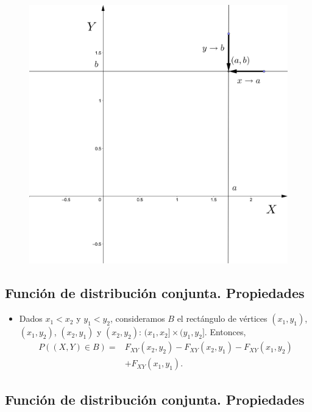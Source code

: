 \documentclass[]{book}
\providecommand{\tightlist}{%
  \setlength{\itemsep}{0pt}\setlength{\parskip}{0pt}}
\begin{document}
\begin{figure}
\includegraphics[width=450px]{Images/Fxy2} \end{figure}

\hypertarget{funciuxf3n-de-distribuciuxf3n-conjunta.-propiedades-3}{%
\subsection{Función de distribución conjunta. Propiedades}\label{funciuxf3n-de-distribuciuxf3n-conjunta.-propiedades-3}}

\begin{itemize}
\tightlist
\item
  Dados \(x_1<x_2\) y \(y_1<y_2\), consideramos \(B\) el rectángulo de vértices \((x_1,y_1)\), \((x_1,y_2)\), \((x_2,y_1)\) y \((x_2,y_2)\): \((x_1,x_2]\times (y_1,y_2]\). Entonces,
  \[
  \begin{array}{rl}
  P((X,Y)\in B)  = & F_{XY}(x_2,y_2)-F_{XY}(x_2,y_1)-F_{XY}(x_1,y_2)\\ & +F_{XY}(x_1,y_1).
  \end{array}
  \]
\end{itemize}

\hypertarget{funciuxf3n-de-distribuciuxf3n-conjunta.-propiedades-4}{%
\subsection{Función de distribución conjunta. Propiedades}\label{funciuxf3n-de-distribuciuxf3n-conjunta.-propiedades-4}}
\end{document}
